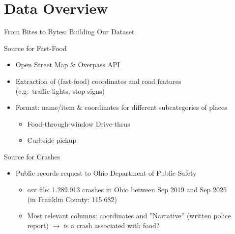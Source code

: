 \documentclass{beamer}
\begin{document}
\section{Data Overview}
\begin{frame}{From Bites to Bytes: Building Our Dataset}
    \begin{block}{Source for Fast-Food}
        \begin{itemize}
            \item Open Street Map \& Overpass API
            \item Extraction of (fast-food) coordinates and road features\\ 
            (e.g.~traffic lights, stop signs)
            \item Format: name/item \& coordinates for different subcategories of places
            \begin{itemize}
                \item Food-through-window Drive-thrus
                \item Curbside pickup
            \end{itemize}
            
            
        \end{itemize}
    \end{block}
    
    \begin{block}{Source for Crashes}
        \begin{itemize}
            \item Public records request to  Ohio Department of Public Safety
            \begin{itemize}
                \item csv file: 1.289.913 crashes in Ohio between Sep 2019 and Sep 2025 \\(in Franklin County: 115.682)
                \item Most relevant columns: coordinates and ''Narrative'' (written police report) $\rightarrow$ is a crash associated with food?
            \end{itemize}
            
      
        \end{itemize}
    \end{block}
    
\end{frame}
\end{document}
